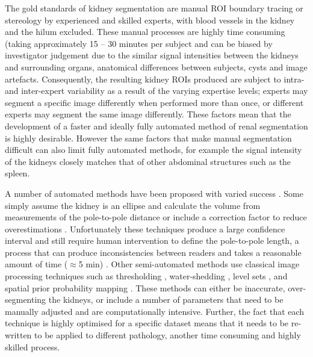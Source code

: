 The gold standards of kidney segmentation are manual \ac{ROI} boundary tracing \cite{di_leo_measurement_2011} or stereology \cite{bae_volumetric_2000} by experienced and skilled experts, with blood vessels in the kidney and the hilum excluded. These manual processes are highly time consuming (taking approximately 15 – 30 minutes per subject \cite{zollner_assessment_2012, sharma_kidney_2017, simms_rapid_2019} and can be biased by investigator judgement due to the similar signal intensities between the kidneys and surrounding organs, anatomical differences between subjects, cysts and image artefacts. Consequently, the resulting kidney \ac{ROI}s produced are subject to intra- and inter-expert variability as a result of the varying expertise levels; experts may segment a specific image differently when performed more than once, or different experts may segment the same image differently. These factors mean that the development of a faster and ideally fully automated method of renal segmentation is highly desirable. However the same factors that make manual segmentation difficult can also limit fully automated methods, for example the signal intensity of the kidneys closely matches that of other abdominal structures such as the spleen.

A number of automated methods have been proposed with varied success \cite{zollner_assessment_2012}. Some simply assume the kidney is an ellipse and calculate the volume from measurements of the pole-to-pole distance \cite{cheong_normal_2007, spithoven_estimation_2015} or include a correction factor to reduce overestimations \cite{seuss_development_2017}. Unfortunately these techniques produce a large confidence interval and still require human intervention to define the pole-to-pole length, a process that can produce inconsistencies between readers and takes a reasonable amount of time ($\approx$5 min) \cite{magistroni_review_2018}. Other semi-automated methods use classical image processing techniques such as thresholding \cite{coulam_measurement_2002}, water-shedding \cite{karstoft_different_2007}, level sets \cite{simms_rapid_2019, gloger_prior_2012}, and spatial prior probability mapping \cite{kim_automated_2016}. These methods can either be inaccurate, over-segmenting the kidneys, or include a number of parameters that need to be manually adjusted and are computationally intensive. Further, the fact that each technique is highly optimised for a specific dataset means that it needs to be re-written to be applied to different pathology, another time consuming and highly skilled process.

